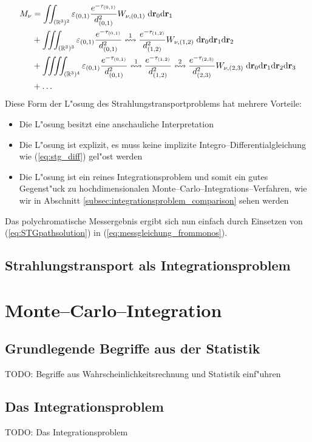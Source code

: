 \documentclass[11pt,a4paper,DIVcalc,BCOR8mm,titlepage,twoside]{scrartcl}
\begin{document}
	\begin{align*}
		M_\nu&=\iint_{(\mathbb{R}^3)^2}\varepsilon_{(0,1)}\frac{e^{-\tau_{(0,1)}}}{d_{(0,1)}^2} W_{\nu,(0,1)} \;\text{d}\mathbf{r}_0\text{d}\mathbf{r}_1 \\
		&+\iiint_{(\mathbb{R}^3)^3}\varepsilon_{(0,1)}\frac{e^{-\tau_{(0,1)}}}{d_{(0,1)}^2}\overset{1}{\leftrightsquigarrow}\frac{e^{-\tau_{(1,2)}}}{d_{(1,2)}^2} W_{\nu,(1,2)} \;\text{d}\mathbf{r}_0\text{d}\mathbf{r}_1\text{d}\mathbf{r}_2 \\
		&+\iiiint_{(\mathbb{R}^3)^4}\varepsilon_{(0,1)}\frac{e^{-\tau_{(0,1)}}}{d_{(0,1)}^2}\overset{1}{\leftrightsquigarrow}\frac{e^{-\tau_{(1,2)}}}{d_{(1,2)}^2}\overset{2}{\leftrightsquigarrow}\frac{e^{-\tau_{(2,3)}}}{d_{(2,3)}^2} W_{\nu,(2,3)} \;\text{d}\mathbf{r}_0\text{d}\mathbf{r}_1\text{d}\mathbf{r}_2\text{d}\mathbf{r}_3 \\
		&+\hdots
	\end{align*}
	Diese Form der L"osung des Strahlungstransportproblems hat mehrere Vorteile:
	\begin{itemize}
		\item{Die L"osung besitzt eine anschauliche Interpretation}
		\item{Die L"osung ist explizit, es muss keine implizite Integro--Differentialgleichung wie (\ref{eq:stg_diff}) gel"ost werden}
		\item{Die L"osung ist ein reines Integrationsproblem und somit ein gutes Gegenst"uck zu hochdimensionalen Monte--Carlo--Integrations--Verfahren, wie wir in Abschnitt \ref{subsec:integrationsproblem_comparison} sehen werden}
	\end{itemize}
	Das polychromatische Messergebnis ergibt sich nun einfach durch Einsetzen von (\ref{eq:STGpathsolution}) in (\ref{eq:messgleichung_frommonos}).


	\subsection{Strahlungstransport als Integrationsproblem}
	
	\section{Monte--Carlo--Integration}
	\subsection{Grundlegende Begriffe aus der Statistik}
	TODO: Begriffe aus Wahrscheinlichkeitsrechnung und Statistik einf"uhren
	\subsection{Das Integrationsproblem}\label{subsec:integrationsproblem}
	TODO: Das Integrationsproblem
\end{document}
